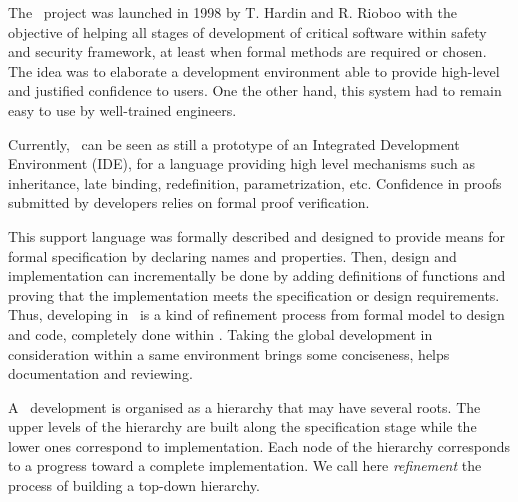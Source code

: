 The \focal\ project was launched in 1998 by T. Hardin and R. Rioboo
\cite{HardinRiobooTSI04} with the 
objective of helping all stages of development of critical software
within safety and security framework, at least when formal methods are
required or chosen. The idea was to elaborate a development
environment able to provide high-level and justified confidence to
users. One the other hand, this system had to remain easy to use by
well-trained engineers.

Currently, \focal\ can be seen as still a prototype of an Integrated
Development Environment (IDE), for a language providing high level
mechanisms such as inheritance, late binding, redefinition,
parametrization, etc.  Confidence in proofs submitted by developers
relies on formal proof verification.

This support language was formally described and designed to provide
means for formal specification by declaring names and
properties. Then, design and implementation can incrementally be done
by adding definitions of functions and proving that the implementation
meets the specification or design requirements. Thus, developing in
\focal\ is a kind of refinement process from  formal model to design
and code, completely done within \focal. Taking the global development
in consideration within a same environment brings some conciseness,
helps documentation and reviewing.

A \focal\ development is organised as a hierarchy that may have
several roots. The upper levels of the hierarchy are built along the
specification stage while the lower ones correspond to
implementation. Each node of the hierarchy corresponds to a progress
toward a complete implementation.  We call here {\em refinement} the
process of building a top-down hierarchy.

